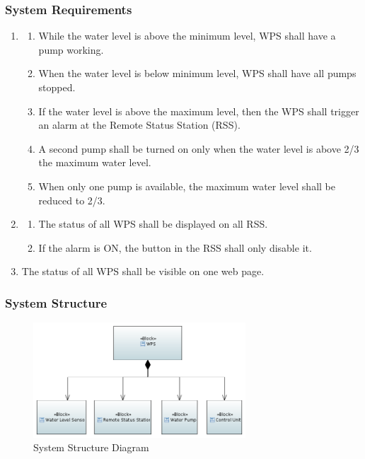 \documentclass[11pt]{article}
\begin{document}
\subsubsection{System Requirements}

\begin{enumerate}[leftmargin=4em, font=\small, label=\textbf{SR-\arabic*}]
	\setlength\itemsep{.5em}
	\item 
		\begin{enumerate}[leftmargin=1.5em, font=\small, label=\textbf{.\arabic*:}]
		\setlength\itemsep{0em}
		\item While the water level is above the minimum level, WPS shall have a pump working.
		\item When the water level is below minimum level, WPS shall have all pumps stopped.
		\item If the water level is above the maximum level, then the WPS shall trigger an alarm at the Remote Status Station (RSS).
		\item A second pump shall be turned on only when the water level is above 2/3 the maximum water level.
		\item When only one pump is available, the maximum water level shall be reduced to 2/3.
		\end{enumerate}
	\item
		\begin{enumerate}[leftmargin=1.5em, font=\small, label=\textbf{.\arabic*:}]s
		\setlength\itemsep{0em}
		\item The status of all WPS shall be displayed on all RSS.
		\item If the alarm is ON, the button in the RSS shall only disable it.
		\end{enumerate}
	\item The status of all WPS shall be visible on one web page.

\end{enumerate}

\subsubsection{System Structure}

\begin{figure}[H]
  \includegraphics[width=300px]{../diagrams/system-structure.png}
  \caption{System Structure Diagram}
  \label{fig:System Structure Diagram}
\end{figure}
\end{document}
